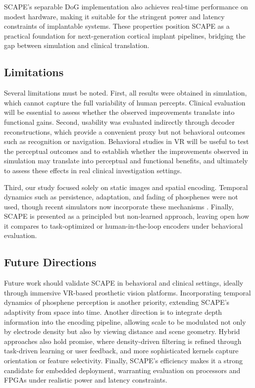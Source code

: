 SCAPE’s separable DoG implementation also achieves real-time performance on modest hardware, making it suitable for the stringent power and latency constraints of implantable systems. These properties position SCAPE as a practical foundation for next-generation cortical implant pipelines, bridging the gap between simulation and clinical translation.

\subsection{Limitations}
Several limitations must be noted. First, all results were obtained in simulation, which cannot capture the full variability of human percepts. Clinical evaluation will be essential to assess whether the observed improvements translate into functional gains. Second, usability was evaluated indirectly through decoder reconstructions, which provide a convenient proxy but not behavioral outcomes such as recognition or navigation. Behavioral studies in VR will be useful to test the perceptual outcomes and to establish whether the improvements observed in simulation may translate into perceptual and functional benefits, and ultimately to assess these effects in real clinical investigation settings.

Third, our study focused solely on static images and spatial encoding. Temporal dynamics such as persistence, adaptation, and fading of phosphenes \cite{Schmidt1996,Bak1990,Dobelle1974,Barlett2008,Fernandez2021,Beauchamp2020} were not used, though recent simulators now incorporate these mechanisms \cite{vanderGrinten2024, Fine2024}. Finally, SCAPE is presented as a principled but non-learned approach, leaving open how it compares to task-optimized or human-in-the-loop encoders\cite{Granley2023} under behavioral evaluation.

\subsection{Future Directions}
Future work should validate SCAPE in behavioral and clinical settings, ideally through immersive VR-based prosthetic vision platforms. Incorporating temporal dynamics of phosphene perception is another priority, extending SCAPE’s adaptivity from space into time. Another direction is to integrate depth information into the encoding pipeline, allowing scale to be modulated not only by electrode density but also by viewing distance and scene geometry. Hybrid approaches also hold promise, where density-driven filtering is refined through task-driven learning or user feedback, and more sophisticated kernels capture orientation or feature selectivity. Finally, SCAPE’s efficiency makes it a strong candidate for embedded deployment, warranting evaluation on processors and FPGAs under realistic power and latency constraints.

